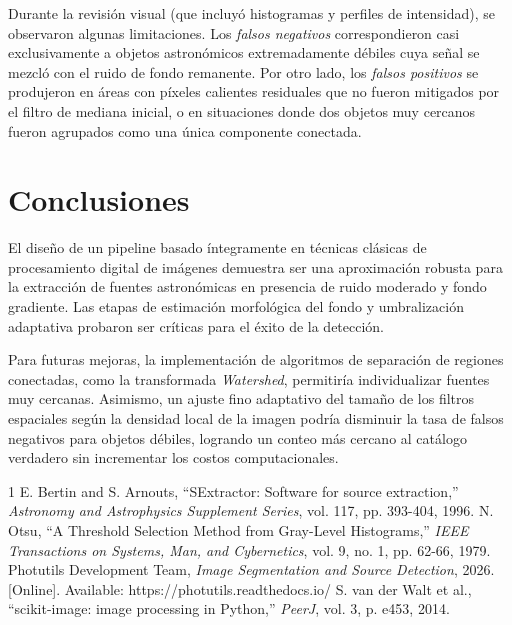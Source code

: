 \documentclass[conference]{IEEEtran}
\begin{document}
Durante la revisión visual (que incluyó histogramas y perfiles de intensidad), se observaron algunas limitaciones. Los \textit{falsos negativos} correspondieron casi exclusivamente a objetos astronómicos extremadamente débiles cuya señal se mezcló con el ruido de fondo remanente. Por otro lado, los \textit{falsos positivos} se produjeron en áreas con píxeles calientes residuales que no fueron mitigados por el filtro de mediana inicial, o en situaciones donde dos objetos muy cercanos fueron agrupados como una única componente conectada.

\section{Conclusiones}
El diseño de un pipeline basado íntegramente en técnicas clásicas de procesamiento digital de imágenes demuestra ser una aproximación robusta para la extracción de fuentes astronómicas en presencia de ruido moderado y fondo gradiente. Las etapas de estimación morfológica del fondo y umbralización adaptativa probaron ser críticas para el éxito de la detección.

Para futuras mejoras, la implementación de algoritmos de separación de regiones conectadas, como la transformada \textit{Watershed}, permitiría individualizar fuentes muy cercanas. Asimismo, un ajuste fino adaptativo del tamaño de los filtros espaciales según la densidad local de la imagen podría disminuir la tasa de falsos negativos para objetos débiles, logrando un conteo más cercano al catálogo verdadero sin incrementar los costos computacionales.

\begin{thebibliography}{1}
 E. Bertin and S. Arnouts, ``SExtractor: Software for source extraction,'' \textit{Astronomy and Astrophysics Supplement Series}, vol. 117, pp. 393-404, 1996.
 N. Otsu, ``A Threshold Selection Method from Gray-Level Histograms,'' \textit{IEEE Transactions on Systems, Man, and Cybernetics}, vol. 9, no. 1, pp. 62-66, 1979.
 Photutils Development Team, \textit{Image Segmentation and Source Detection}, 2026. [Online]. Available: https://photutils.readthedocs.io/
 S. van der Walt et al., ``scikit-image: image processing in Python,'' \textit{PeerJ}, vol. 3, p. e453, 2014.
\end{thebibliography}
\end{document}
